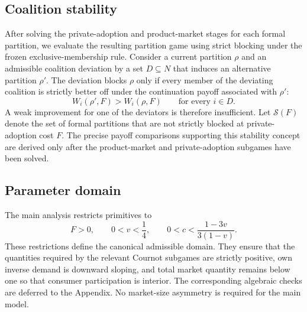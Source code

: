 \subsection{Coalition stability}
\label{subsec:model-stability}

After solving the private-adoption and product-market stages for each formal partition, we evaluate the resulting partition game using strict blocking under the frozen exclusive-membership rule. Consider a current partition $\rho$ and an admissible coalition deviation by a set $D\subseteq N$ that induces an alternative partition $\rho'$. The deviation blocks $\rho$ only if every member of the deviating coalition is strictly better off under the continuation payoff associated with $\rho'$:
\begin{equation}
    W_i(\rho',F)>W_i(\rho,F)
    \qquad\text{for every }i\in D.
    \label{eq:strict-blocking}
\end{equation}
A weak improvement for one of the deviators is therefore insufficient. Let $\mathcal S(F)$ denote the set of formal partitions that are not strictly blocked at private-adoption cost $F$. The precise payoff comparisons supporting this stability concept are derived only after the product-market and private-adoption subgames have been solved.

\subsection{Parameter domain}
\label{subsec:model-domain}

The main analysis restricts primitives to
\begin{equation}
    F>0,
    \qquad
    0<v<\frac14,
    \qquad
    0<c<\frac{1-3v}{3(1-v)}.
    \label{eq:parameter-domain}
\end{equation}
These restrictions define the canonical admissible domain. They ensure that the quantities required by the relevant Cournot subgames are strictly positive, own inverse demand is downward sloping, and total market quantity remains below one so that consumer participation is interior. The corresponding algebraic checks are deferred to the Appendix. No market-size asymmetry is required for the main model.

